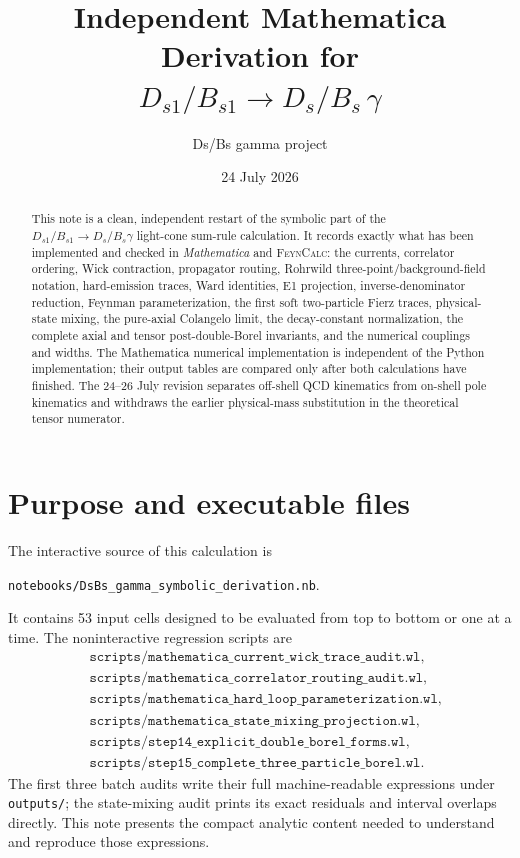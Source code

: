 \documentclass[11pt]{article}
\title{Independent Mathematica Derivation for\\
  $D_{s1}/B_{s1}\to D_s/B_s\,\gamma$}
\author{Ds/Bs gamma project}
\date{24 July 2026}
\newcommand{\Mathematica}{\textit{Mathematica}}
\newcommand{\FeynCalc}{\textsc{FeynCalc}}
\begin{document}
\maketitle

\begin{abstract}
This note is a clean, independent restart of the symbolic part of the
$D_{s1}/B_{s1}\to D_s/B_s\gamma$ light-cone sum-rule calculation.  It records
exactly what has been implemented and checked in \Mathematica{} and
\FeynCalc: the currents, correlator ordering, Wick contraction, propagator
routing, Rohrwild three-point/background-field notation, hard-emission
traces, Ward identities, E1 projection,
inverse-denominator reduction, Feynman parameterization, the first soft
two-particle Fierz traces, physical-state mixing, the pure-axial Colangelo
limit, the decay-constant normalization, the complete axial and tensor
post-double-Borel invariants, and the numerical couplings and widths.  The
Mathematica numerical implementation is independent of the Python
implementation; their output tables are compared only after both
calculations have finished.  The 24--26 July revision separates off-shell
QCD kinematics from on-shell pole kinematics and withdraws the earlier
physical-mass substitution in the theoretical tensor numerator.
\end{abstract}

\tableofcontents

\section{Purpose and executable files}

The interactive source of this calculation is
\begin{center}
  \texttt{notebooks/DsBs\_gamma\_symbolic\_derivation.nb}.
\end{center}
It contains 53 input cells designed to be evaluated from top to bottom or one
at a time.  The noninteractive regression scripts are
\begin{align*}
  &\texttt{scripts/mathematica\_current\_wick\_trace\_audit.wl},\\
  &\texttt{scripts/mathematica\_correlator\_routing\_audit.wl},\\
  &\texttt{scripts/mathematica\_hard\_loop\_parameterization.wl},\\
  &\texttt{scripts/mathematica\_state\_mixing\_projection.wl},\\
  &\texttt{scripts/step14\_explicit\_double\_borel\_forms.wl},\\
  &\texttt{scripts/step15\_complete\_three\_particle\_borel.wl}.
\end{align*}
The first three batch audits write their full machine-readable expressions
under \texttt{outputs/}; the state-mixing audit prints its exact residuals and
interval overlaps directly.  This note presents the compact analytic content
needed to understand and reproduce those expressions.
\end{document}
